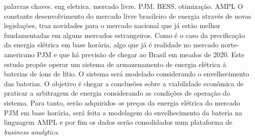 \documentclass[tcc]{poli}
\begin{document}
\pretextual
\maketitle




\begin{resumo}{palavras chaves. eng eletrica. mercado livre. PJM. BESS. otimização. AMPL}
%
O constante desenvolvimento do mercado livre brasileiro de energia através de novas legislações, traz novidades para o mercado nacional que já estão melhor fundamentadas em alguns mercados estrangeiros. Como é o caso da precificação da energia elétrica em base horária, algo que já é realidade no mercado norte-americano PJM e que há previsão de chegar ao Brasil em meados de 2020. Este estudo propõe operar um sistema de armazenamento de energia elétrica à baterias de íons de lítio. O sistema será modelado considerando o envelhecimento das baterias. O objetivo é chegar a conclusões sobre a viabilidade econômica de praticar a arbitragem de energia considerando as condições de operação do sistema. Para tanto, serão adquiridos os preços da energia elétrica do mercado PJM em base horária, será feita a modelagem do envelhecimento da bateria na linguagem AMPL e por fim os dados serão consolidados num plataforma de \textit{business analytics}.

\end{resumo}


\begin{abstract}{key words. electrical eng. energy market. PJM. BESS. optimization. AMPL}
%
The constant development of the Brazilian free energy market through new legislations, brings news to the national market that are already consolidate in some foreign markets. As the case with hourly priced electricity, something that is already a reality in the USA PJM market and that is expected to arrive in Brazil by 2020. This study proposes to operate a lithium-ion battery energy storage system on the PJM market. The system will be modeled considering the aging of the batteries. The objective is to come to conclusions about the monetary feasibility considering this operation as an investment. In order to achieve this, the electric energy prices of the PJM market will be acquired on an hourly basis, the aging of the battery will be modeled in the AMPL language and finally the data will be consolidated in a business analytics platform.
%
\end{abstract}
\end{document}

